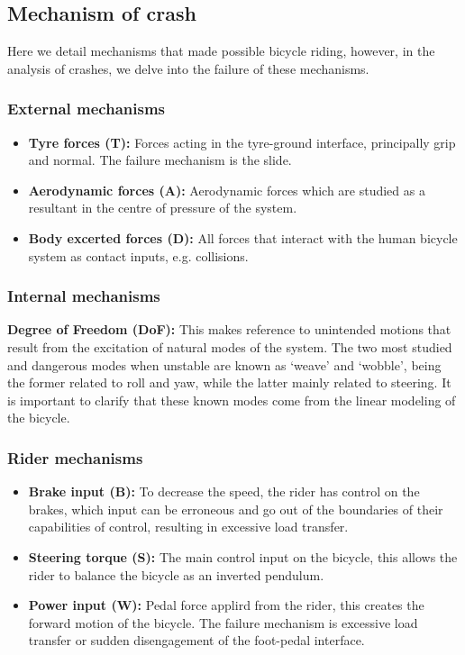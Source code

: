 \documentclass{article}
\begin{document}
\subsection{Mechanism of crash}

Here we detail mechanisms that made possible bicycle riding, however, in the analysis of crashes, we delve into the failure of these mechanisms.

\subsubsection{External mechanisms}
\begin{itemize}
    \item \textbf{Tyre forces (T):} Forces acting in the tyre-ground interface, principally grip and normal. The failure mechanism is the slide.
    \item \textbf{Aerodynamic forces (A):} Aerodynamic forces which are studied as a resultant in the centre of pressure of the system.
    \item \textbf{Body excerted forces (D):} All forces that interact with the human bicycle system as contact inputs, e.g. collisions.
\end{itemize}

\subsubsection{Internal mechanisms}

\textbf{Degree of Freedom (DoF):} This makes reference to unintended motions that result from the excitation of natural modes of the system.
%
The two most studied and dangerous modes when unstable are known as `weave' and `wobble', being the former related to roll and yaw, while the latter mainly related to steering.
%
It is important to clarify that these known modes come from the linear modeling of the bicycle.

\subsubsection{Rider mechanisms}
\begin{itemize}
    \item \textbf{Brake input (B):} To decrease the speed, the rider has control on the brakes, which input can be erroneous and go out of the boundaries of their capabilities of control, resulting in excessive load transfer.
    \item \textbf{Steering torque (S):} The main control input on the bicycle, this allows the rider to balance the bicycle as an inverted pendulum.
    \item \textbf{Power input (W):} Pedal force applird from the rider, this creates the forward motion of the bicycle.
        The failure mechanism is excessive load transfer or sudden disengagement of the foot-pedal interface.
\end{itemize}
\end{document}
